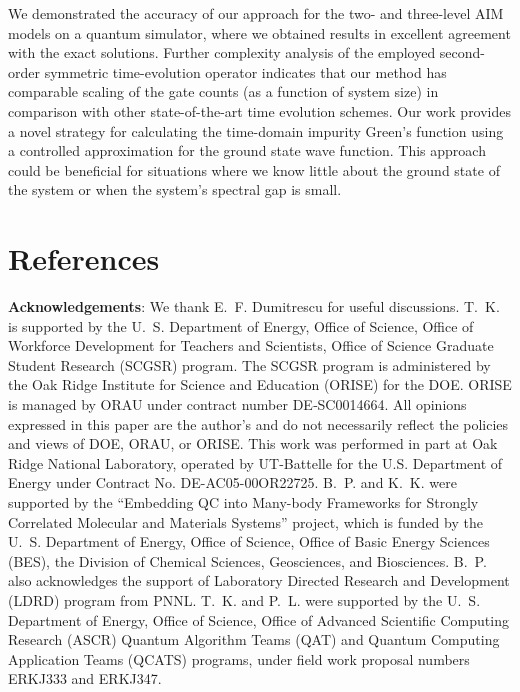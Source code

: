 \documentclass[aip,reprint,table,xcdraw,usenames,dvipsnames]{revtex4-1}
\begin{document}
We demonstrated the accuracy of our approach for the two- and three-level AIM models on a quantum simulator, where we obtained results in excellent agreement with the exact solutions. Further complexity analysis of the employed second-order symmetric time-evolution operator indicates that our method has comparable scaling of the gate counts (as a function of system size) in comparison with other state-of-the-art time evolution schemes. Our work provides a novel strategy for calculating the time-domain impurity Green's function using a controlled approximation for the ground state wave function. This approach could be beneficial for situations where we know little about the ground state of the system or when the system's spectral gap is small. 


\section*{References}

\vspace{0.5cm}
\noindent
{\bf Acknowledgements}: We thank E.~F. Dumitrescu for useful discussions. T.~K. is supported by the U.~S. Department of Energy, Office of Science, Office of Workforce Development for Teachers and Scientists, Office of Science Graduate Student Research (SCGSR) program. The SCGSR program is administered by the Oak Ridge Institute for Science and Education (ORISE) for the DOE. ORISE is managed by ORAU under contract number DE‐SC0014664. All opinions expressed in this paper are the author’s and do not necessarily reflect the policies and views of DOE, ORAU, or ORISE. This work was performed in part at Oak Ridge National Laboratory, operated by UT-Battelle for the U.S. Department of Energy under Contract No. DE-AC05-00OR22725. B.~P. and K.~K. were supported by  the ``Embedding QC into Many-body Frameworks for Strongly Correlated  Molecular and Materials Systems'' project, which is funded by the U.~S. Department of Energy, Office of Science, Office of Basic Energy Sciences (BES), the Division of Chemical Sciences, Geosciences, and Biosciences. B.~P. also acknowledges the support of Laboratory Directed Research and Development (LDRD) program from PNNL. T.~K. and P.~L. were supported by the U.~S. Department of Energy, Office of Science, Office of Advanced Scientific Computing Research (ASCR) Quantum Algorithm Teams (QAT) and Quantum Computing Application Teams (QCATS) programs, under field work proposal numbers ERKJ333 and ERKJ347.\\
\end{document}
